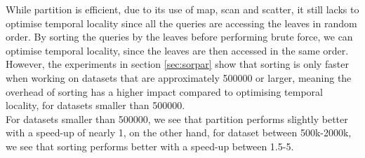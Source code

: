 While partition is efficient, due to its use of map, scan and scatter, it still lacks to optimise temporal locality since all the queries are accessing the leaves in random order. By sorting the queries by the leaves before performing brute force, we can optimise temporal locality, since the leaves are then accessed in the same order. 
\\[2mm]
However, the experiments in section \ref{sec:sorpar} show that sorting is only faster when working on datasets that are approximately 500000 or larger, meaning the overhead of sorting has a higher impact compared to optimising temporal locality, for datasets smaller than 500000. 
\\[2mm]
For datasets smaller than 500000, we see that partition performs slightly better with a speed-up of nearly 1, on the other hand, for dataset between 500k-2000k, we see that sorting performs better with a speed-up between 1.5-5.













































